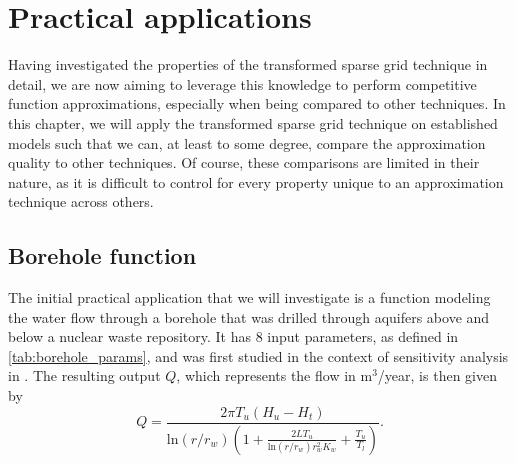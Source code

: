 \documentclass[
  a4paper,  %
  twoside,  %
  bibliography=totoc,
  headsepline,
  cleardoublepage=empty,
  parskip=half,
  draft=false
]{scrbook}
\begin{document}
\chapter{Practical applications}
\label{chap:c8}

Having investigated the properties of the transformed sparse grid technique in detail, we are now aiming to leverage this knowledge to perform competitive function approximations, especially when being compared to other techniques.
In this chapter, we will apply the transformed sparse grid technique on established models such that we can, at least to some degree, compare the approximation quality to other techniques.
Of course, these comparisons are limited in their nature, as it is difficult to control for every property unique to an approximation technique across others.

\section{Borehole function}

The initial practical application that we will investigate is a function modeling the water flow through a borehole that was drilled through aquifers above and below a nuclear waste repository.
It has 8 input parameters, as defined in \cref{tab:borehole_params}, and was first studied in the context of sensitivity analysis in \cite{Harper1983}.
The resulting output $Q$, which represents the flow in m$^3$/year, is then given by
\begin{equation}
Q=\frac{2 \pi T_u(H_u - H_t)}{\text{ln}(r / r_w) \left( 1 + \frac{2L T_u}{\text{ln}(r / r_w) r_w^2 K_w} + \frac{T_u}{T_l} \right)}.
\end{equation}
\end{document}
